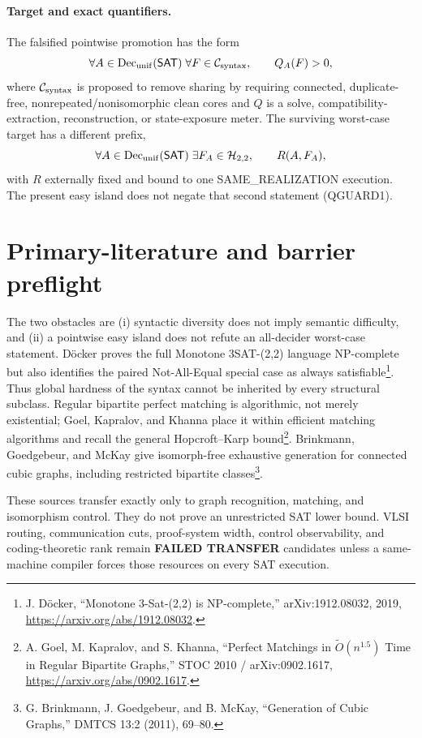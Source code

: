 \documentclass[11pt]{article}
\newcommand{\SAT}{\mathsf{SAT}}
\newcommand{\Htwo}{\mathcal H_{2,2}}
\begin{document}
\paragraph{Target and exact quantifiers.}
The falsified pointwise promotion has the form
\[
 \forall A\in\operatorname{Dec}_{\rm unif}(\SAT)\;
 \forall F\in\mathcal C_{\rm syntax},\qquad Q_A(F)>0,
\]
where \(\mathcal C_{\rm syntax}\) is proposed to remove sharing by requiring
connected, duplicate-free, nonrepeated/nonisomorphic clean cores and \(Q\) is
a solve, compatibility-extraction, reconstruction, or state-exposure meter.
The surviving worst-case target has a different prefix,
\[
 \forall A\in\operatorname{Dec}_{\rm unif}(\SAT)\;
 \exists F_A\in\Htwo,\qquad R(A,F_A),
\]
with \(R\) externally fixed and bound to one SAME\_REALIZATION execution.
The present easy island does not negate that second statement (QGUARD1).

\section{Primary-literature and barrier preflight}

The two obstacles are (i) syntactic diversity does not imply semantic
difficulty, and (ii) a pointwise easy island does not refute an all-decider
worst-case statement.  Döcker proves the full Monotone 3SAT-(2,2) language
NP-complete but also identifies the paired Not-All-Equal special case as
always satisfiable\footnote{J. Döcker, ``Monotone 3-Sat-(2,2) is
NP-complete,'' arXiv:1912.08032, 2019,
\url{https://arxiv.org/abs/1912.08032}.}.  Thus global hardness of the syntax
cannot be inherited by every structural subclass.  Regular bipartite perfect
matching is algorithmic, not merely existential; Goel, Kapralov, and Khanna
place it within efficient matching algorithms and recall the general
Hopcroft--Karp bound\footnote{A. Goel, M. Kapralov, and S. Khanna, ``Perfect
Matchings in \(\widetilde O(n^{1.5})\) Time in Regular Bipartite Graphs,''
STOC 2010 / arXiv:0902.1617,
\url{https://arxiv.org/abs/0902.1617}.}.  Brinkmann, Goedgebeur, and McKay give
isomorph-free exhaustive generation for connected cubic graphs, including
restricted bipartite classes\footnote{G. Brinkmann, J. Goedgebeur, and
B. McKay, ``Generation of Cubic Graphs,'' DMTCS 13:2 (2011), 69--80.}.

These sources transfer exactly only to graph recognition, matching, and
isomorphism control.  They do not prove an unrestricted SAT lower bound.
VLSI routing, communication cuts, proof-system width, control observability,
and coding-theoretic rank remain \textbf{FAILED TRANSFER} candidates unless a
same-machine compiler forces those resources on every SAT execution.
\end{document}

